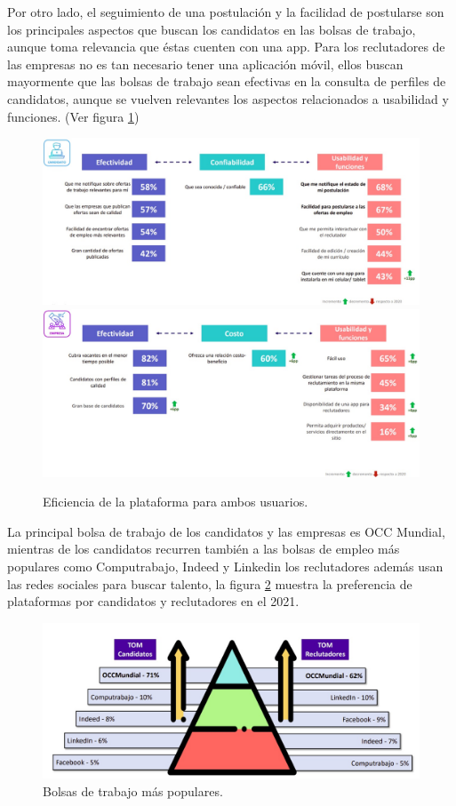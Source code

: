 Por otro lado, el seguimiento de una postulación y la facilidad de postularse son los principales aspectos que buscan los candidatos en las bolsas de trabajo, aunque toma relevancia que éstas cuenten con una app. Para los reclutadores de las empresas no es tan necesario tener una aplicación móvil, ellos buscan mayormente que las bolsas de trabajo sean efectivas en la consulta de perfiles de candidatos, aunque se vuelven relevantes los aspectos relacionados a usabilidad y funciones. \cite{AIMX}\cite{Evo} (Ver figura \ref{mark:efi})
    \begin{figure}[H]
        \begin{center}
            \includegraphics[width=.7\textwidth]{antecedentes/imagenes/prefC.jpeg}
            \includegraphics[width=.7\textwidth]{antecedentes/imagenes/prefE.jpeg}
        \end{center}
        \caption{Eficiencia de la plataforma para ambos usuarios.}
        \label{mark:efi}
    \end{figure}

La principal bolsa de trabajo de los candidatos y las empresas es OCC Mundial, mientras de los candidatos recurren también a las 
bolsas de empleo más populares como Computrabajo, Indeed y Linkedin los reclutadores además usan las redes sociales para buscar talento, la
figura \ref{mark:top} muestra la preferencia de plataformas por candidatos y reclutadores en el 2021.\cite{Evo}
\begin{figure}[H]
    \begin{center}
        \includegraphics[width=.8\textwidth]{antecedentes/imagenes/topbdt.jpeg}
    \end{center}
    \caption{Bolsas de trabajo más populares.}
    \label{mark:top}
\end{figure}



